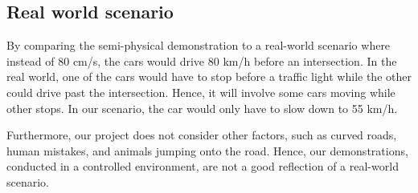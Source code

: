 \subsection{Real world scenario}
By comparing the semi-physical demonstration to a real-world scenario where instead of 80 cm/s, the cars would drive 80 km/h before an intersection. In the real world, one of the cars would have to stop before a traffic light while the other could drive past the intersection. Hence, it will involve some cars moving while other stops. In our scenario, the car would only have to slow down to 55 km/h.

Furthermore, our project does not consider other factors, such as curved roads, human mistakes, and animals jumping onto the road. Hence, our demonstrations, conducted in a controlled environment, are not a good reflection of a real-world scenario.